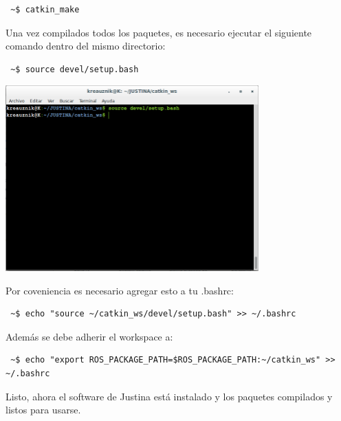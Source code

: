 \documentclass[user_manual.tex]{subfiles}
\begin{document}
\begin{verbatim}
 ~$ catkin_make
\end{verbatim}

Una vez compilados todos los paquetes, es necesario ejecutar el siguiente comando dentro del mismo directorio:

\begin{verbatim}
 ~$ source devel/setup.bash
\end{verbatim}

 \begin{center}
\includegraphics[width=0.73\textwidth]{Figures/PP/pp5.png}
\end{center}

Por coveniencia es necesario agregar esto a tu .bashrc:\\

\begin{verbatim}
 ~$ echo "source ~/catkin_ws/devel/setup.bash" >> ~/.bashrc
\end{verbatim}

Además se debe adherir el workspace a:\\

\begin{verbatim}
 ~$ echo "export ROS_PACKAGE_PATH=$ROS_PACKAGE_PATH:~/catkin_ws" >> ~/.bashrc
\end{verbatim}

Listo, ahora el software de Justina está instalado y los paquetes compilados y listos para usarse.
\end{document}
